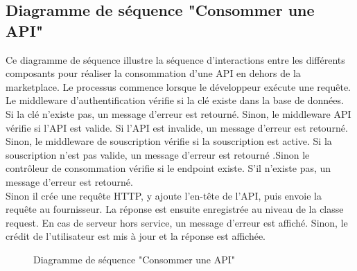 \subsection{Diagramme de séquence "Consommer une API"}
Ce diagramme de séquence illustre la séquence d'interactions entre les différents composants pour réaliser la consommation d’une API en dehors de la marketplace. Le processus commence lorsque le développeur exécute une requête. \\ 
Le middleware d'authentification vérifie si la clé existe dans la base de données. Si la clé n'existe pas, un message d’erreur est retourné. Sinon, le middleware API vérifie si l'API est valide. Si l'API est invalide, un message d’erreur est retourné. \\ 
Sinon, le middleware de souscription vérifie si la souscription est active. Si la souscription n'est pas valide, un message d'erreur est retourné .Sinon le contrôleur de consommation vérifie si le endpoint existe. S'il n'existe pas, un message d’erreur est retourné. \\
Sinon il  crée une requête HTTP, y ajoute l’en-tête de l'API, puis envoie la requête au fournisseur. La réponse est ensuite enregistrée au niveau de la classe request. En cas de serveur hors service, un message d'erreur est affiché. Sinon, le crédit de l'utilisateur est mis à jour et la réponse est affichée.
\begin{figure}[H]
    \centering
    \caption{Diagramme de séquence "Consommer une API"}
    \label{fig:logo_tt}
\end{figure}
\pagebreak


